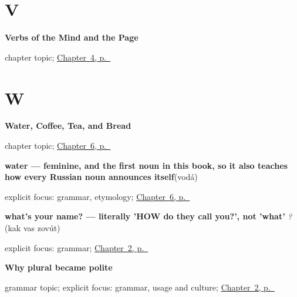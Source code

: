 \section*{V}

\noindent\begin{minipage}[t]{\linewidth}
\raggedright
\textbf{Verbs of the Mind and the Page}\par
\footnotesize chapter topic; \hyperref[ch:russian-verbs-of-the-mind]{Chapter~4, p.~\pageref*{ch:russian-verbs-of-the-mind}}
\end{minipage}\par\smallskip

\section*{W}

\noindent\begin{minipage}[t]{\linewidth}
\raggedright
\textbf{Water, Coffee, Tea, and Bread}\par
\footnotesize chapter topic; \hyperref[ch:russian-water-coffee-tea-bread]{Chapter~6, p.~\pageref*{ch:russian-water-coffee-tea-bread}}
\end{minipage}\par\smallskip

\noindent\begin{minipage}[t]{\linewidth}
\raggedright
\textbf{water — feminine, and the first noun in this book, so it also teaches how every Russian noun announces itself}\enspace\emph{}\enspace(vodá)\par
\footnotesize explicit focus: grammar, etymology; \hyperref[ch:russian-water-coffee-tea-bread]{Chapter~6, p.~\pageref*{ch:russian-water-coffee-tea-bread}}
\end{minipage}\par\smallskip

\noindent\begin{minipage}[t]{\linewidth}
\raggedright
\textbf{what's your name? — literally 'HOW do they call you?', not 'what'}\enspace\emph{  ?}\enspace(kak vas zovút)\par
\footnotesize explicit focus: grammar; \hyperref[ch:russian-introductions]{Chapter~2, p.~\pageref*{ch:russian-introductions}}
\end{minipage}\par\smallskip

\noindent\begin{minipage}[t]{\linewidth}
\raggedright
\textbf{Why plural \emph{} became polite}\par
\footnotesize grammar topic; explicit focus: grammar, usage and culture; \hyperref[ch:russian-introductions]{Chapter~2, p.~\pageref*{ch:russian-introductions}}
\end{minipage}\par\smallskip

